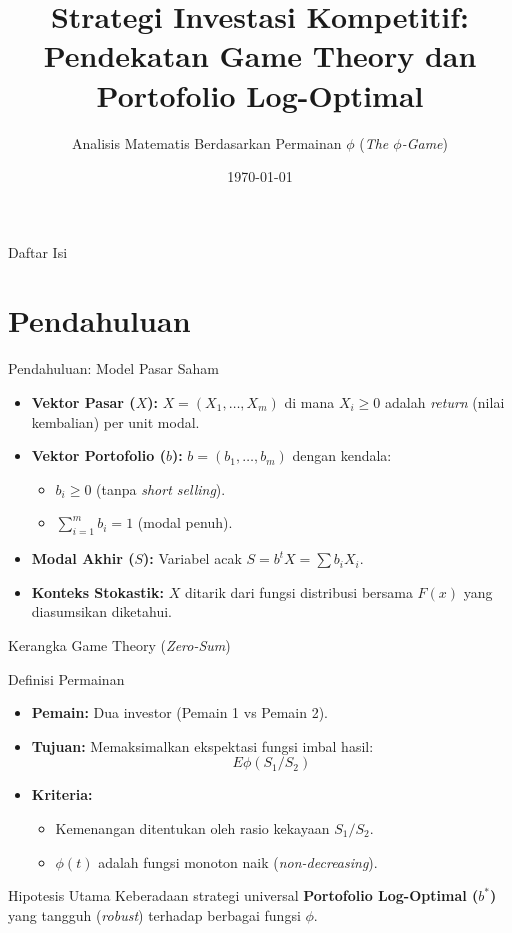 \documentclass{beamer}
\title[Strategi Investasi Kompetitif]{Strategi Investasi Kompetitif: Pendekatan Game Theory dan Portofolio Log-Optimal}
\subtitle{Analisis Matematis Berdasarkan Permainan $\phi$ (\textit{The $\phi$-Game})}
\date{\today}
\begin{document}
\begin{frame}
    \titlepage
\end{frame}

\begin{frame}{Daftar Isi}
    \tableofcontents
\end{frame}

\section{Pendahuluan}

\begin{frame}{Pendahuluan: Model Pasar Saham}
    \begin{itemize}
        \item \textbf{Vektor Pasar ($X$):} 
        $X = (X_1, \dots, X_m)$ di mana $X_i \ge 0$ adalah \textit{return} (nilai kembalian) per unit modal.
        \item \textbf{Vektor Portofolio ($b$):} 
        $b = (b_1, \dots, b_m)$ dengan kendala:
        \begin{itemize}
            \item $b_i \ge 0$ (tanpa \textit{short selling}).
            \item $\sum_{i=1}^m b_i = 1$ (modal penuh).
        \end{itemize}
        \item \textbf{Modal Akhir ($S$):} 
        Variabel acak $S = b^t X = \sum b_i X_i$.
        \item \textbf{Konteks Stokastik:} 
        $X$ ditarik dari fungsi distribusi bersama $F(x)$ yang diasumsikan diketahui.
    \end{itemize}
\end{frame}

\begin{frame}{Kerangka Game Theory (\textit{Zero-Sum})}
    \begin{block}{Definisi Permainan}
        \begin{itemize}
            \item \textbf{Pemain:} Dua investor (Pemain 1 vs Pemain 2).
            \item \textbf{Tujuan:} Memaksimalkan ekspektasi fungsi imbal hasil:
            $$E\phi(S_1/S_2)$$
            \item \textbf{Kriteria:} 
            \begin{itemize}
                \item Kemenangan ditentukan oleh rasio kekayaan $S_1/S_2$.
                \item $\phi(t)$ adalah fungsi monoton naik (\textit{non-decreasing}).
            \end{itemize}
        \end{itemize}
    \end{block}
    \begin{alertblock}{Hipotesis Utama}
        Keberadaan strategi universal \textbf{Portofolio Log-Optimal ($b^*$)} yang tangguh (\textit{robust}) terhadap berbagai fungsi $\phi$.
    \end{alertblock}
\end{frame}
\end{document}
